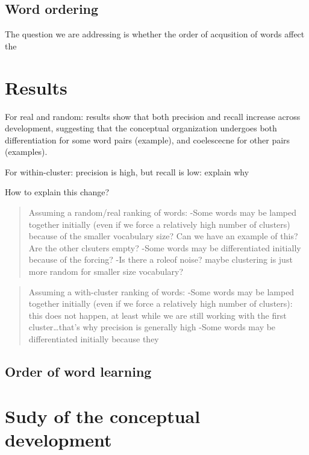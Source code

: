 \documentclass[11pt]{article}
\begin{document}
\subsection{Word ordering}\label{word-ordering}

The question we are addressing is whether the order of acqusition of
words affect the

\section{Results}\label{results}

For real and random: results show that both precision and recall
increase across development, suggesting that the conceptual organization
undergoes both differentiation for some word pairs (example), and
coelescecne for other pairs (examples).

For within-cluster: precision is high, but recall is low: explain why

How to explain this change?

\begin{quote}
Assuming a random/real ranking of words: -Some words may be lamped
together initially (even if we force a relatively high number of
clusters) because of the smaller vocabulary size? Can we have an example
of this? Are the other clsuters empty? -Some words may be differentiated
initially because of the forcing? -Is there a roleof noise? maybe
clustering is just more random for smaller size vocabulary?
\end{quote}

\begin{quote}
Assuming a with-cluster ranking of words: -Some words may be lamped
together initially (even if we force a relatively high number of
clusters): this does not happen, at least while we are still working
with the first cluster\ldots{}that's why precision is generally high
-Some words may be differentiated initially because they
\end{quote}

\subsection{Order of word learning}\label{order-of-word-learning}

\section{Sudy of the conceptual
development}\label{sudy-of-the-conceptual-development}
\end{document}

